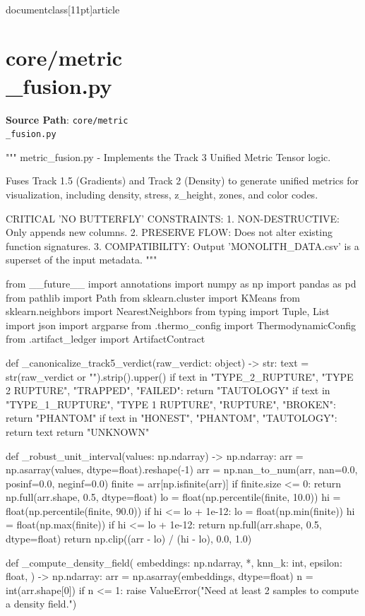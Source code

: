\\documentclass[11pt]{article}
\begin{document}
\section*{core/metric\\_fusion.py}
\textbf{Source Path}: \texttt{core/metric\\_fusion.py}\par
\bigskip
\begin{CodeBlock}
"""
metric_fusion.py - Implements the Track 3 Unified Metric Tensor logic.

Fuses Track 1.5 (Gradients) and Track 2 (Density) to generate unified metrics
for visualization, including density, stress, z_height, zones, and color codes.

CRITICAL 'NO BUTTERFLY' CONSTRAINTS:
1. NON-DESTRUCTIVE: Only appends new columns.
2. PRESERVE FLOW: Does not alter existing function signatures.
3. COMPATIBILITY: Output 'MONOLITH_DATA.csv' is a superset of the input metadata.
"""

from __future__ import annotations
import numpy as np
import pandas as pd
from pathlib import Path
from sklearn.cluster import KMeans
from sklearn.neighbors import NearestNeighbors
from typing import Tuple, List
import json
import argparse
from .thermo_config import ThermodynamicConfig
from .artifact_ledger import ArtifactContract


def _canonicalize_track5_verdict(raw_verdict: object) -> str:
    text = str(raw_verdict or "").strip().upper()
    if text in {"TYPE_2_RUPTURE", "TYPE 2 RUPTURE", "TRAPPED", "FAILED"}:
        return "TAUTOLOGY"
    if text in {"TYPE_1_RUPTURE", "TYPE 1 RUPTURE", "RUPTURE", "BROKEN"}:
        return "PHANTOM"
    if text in {"HONEST", "PHANTOM", "TAUTOLOGY"}:
        return text
    return "UNKNOWN"


def _robust_unit_interval(values: np.ndarray) -> np.ndarray:
    arr = np.asarray(values, dtype=float).reshape(-1)
    arr = np.nan_to_num(arr, nan=0.0, posinf=0.0, neginf=0.0)
    finite = arr[np.isfinite(arr)]
    if finite.size <= 0:
        return np.full(arr.shape, 0.5, dtype=float)
    lo = float(np.percentile(finite, 10.0))
    hi = float(np.percentile(finite, 90.0))
    if hi <= lo + 1e-12:
        lo = float(np.min(finite))
        hi = float(np.max(finite))
    if hi <= lo + 1e-12:
        return np.full(arr.shape, 0.5, dtype=float)
    return np.clip((arr - lo) / (hi - lo), 0.0, 1.0)


def _compute_density_field(
    embeddings: np.ndarray,
    *,
    knn_k: int,
    epsilon: float,
) -> np.ndarray:
    arr = np.asarray(embeddings, dtype=float)
    n = int(arr.shape[0])
    if n <= 1:
        raise ValueError("Need at least 2 samples to compute a density field.")


\end{CodeBlock}
\end{document}
